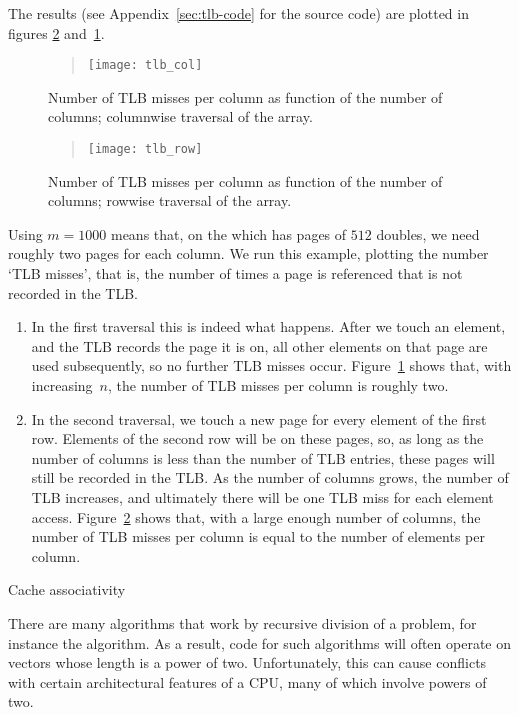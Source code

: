 The results (see Appendix~\ref{sec:tlb-code} for the source code) are
plotted in figures \ref{fig:tlb_row} and~\ref{fig:tlb_col}. 

\begin{figure}[ht]
  \begin{quote}
  \texttt{[image: tlb\_col]}
  \end{quote}
  \caption{Number of TLB misses per column as function of the number
    of columns; columnwise traversal of the array.}
  \label{fig:tlb_col}
\end{figure}
\begin{figure}[ht]
  \begin{quote}
  \texttt{[image: tlb\_row]}
  \end{quote}
  \caption{Number of TLB misses per column as function of the number
    of columns; rowwise traversal of the array.}
  \label{fig:tlb_row}
\end{figure}

Using $m=1000$ means that, on the  which
has pages of $512$ doubles, we need roughly two pages for each
column. We run this example, plotting the number `TLB misses', that
is, the number of times a page is referenced that is not recorded in
the TLB.
\begin{enumerate}
\item In the first traversal this is indeed what happens. After we
  touch an element, and the TLB records the page it is on, all other
  elements on that page are used subsequently, so no further TLB
  misses occur. Figure~\ref{fig:tlb_col} shows that, with increasing~$n$,
  the number of TLB misses per column is roughly two.
\item In the second traversal, we touch a new page for every element
  of the first row. Elements of the second row will be on these pages,
  so, as long as the number of columns is less than the number of TLB
  entries, these pages will still be recorded in the TLB. As the
  number of columns grows, the number of TLB increases, and ultimately
  there will be one TLB miss for each element
  access. Figure~\ref{fig:tlb_row} shows that, with a large enough number
  of columns, the number of TLB misses per column is equal to the
  number of elements per column.
\end{enumerate}

 {Cache associativity}
\label{sec:assoc-coding}

There are many algorithms that work by recursive division of a
problem, for instance the  algorithm. As a result, code
for such algorithms will often operate on vectors whose length is a power of
two. Unfortunately, this can cause conflicts with certain
architectural features of a CPU, many of which involve powers of two.

